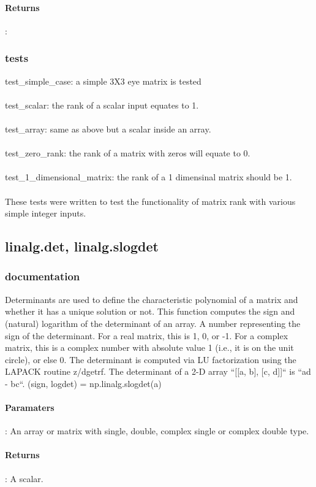 \documentclass[a4paper,11pt]{article}
\begin{document}
\paragraph{Returns}: 
\subsubsection{tests}
test\_simple\_case: a simple 3X3 eye matrix is tested \\
\\
test\_scalar: the rank of a scalar input equates to 1. \\
\\
test\_array: same as above but a scalar inside an array. \\
\\
test\_zero\_rank: the rank of a matrix with zeros will equate to 0. \\
\\
test\_1\_dimensional\_matrix: the rank of a 1 dimensinal matrix should be 1. \\
\\
These tests were written to test the functionality of matrix rank with various simple integer inputs. 


\subsection{linalg.det, linalg.slogdet}
\subsubsection{documentation}
Determinants are used to define the characteristic polynomial of a matrix and whether it has a unique solution or not. This function computes the sign and (natural) logarithm of the determinant of an array. A number representing the sign of the determinant. For a real matrix,
this is 1, 0, or -1. For a complex matrix, this is a complex number with absolute value 1 (i.e., it is on the unit circle), or else 0. The determinant is computed via LU factorization using the LAPACK
routine z/dgetrf. The determinant of a 2-D array ``[[a, b], [c, d]]`` is ``ad - bc``. (sign, logdet) = np.linalg.slogdet(a)
\paragraph{Paramaters}: An array or matrix with single, double, complex single or complex double type. 
\paragraph{Returns}: A scalar. 
\end{document}

